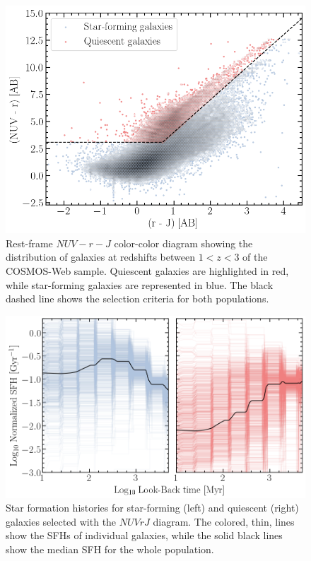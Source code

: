 \documentclass[longauth]{aa}
\begin{document}
\begin{figure}[t!]
\includegraphics[width=1\columnwidth]{figures/nrk_cig.png}
\caption{Rest-frame $NUV-r-J$ color-color diagram showing the distribution of galaxies at redshifts between $1<z<3$ of the COSMOS-Web sample. Quiescent galaxies are highlighted in red, while star-forming galaxies are represented in blue. The black dashed line shows the selection criteria \citep{ilbert_mass_2013} for both populations. \label{fig:NRK}}
\end{figure}

\begin{figure}[t!]
\includegraphics[width=1\columnwidth]{figures/sf-qs_sfhs.png}
\caption{Star formation histories for star-forming (left) and quiescent (right) galaxies selected with the $NUVrJ$ diagram. The colored, thin, lines show the SFHs of individual galaxies, while the solid black lines show the median SFH for the whole population.
\label{fig:sf_qs-sfhs}}
\end{figure}
\end{document}
